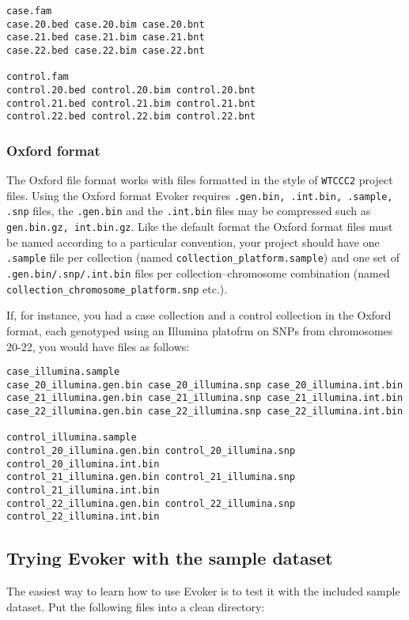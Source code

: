 \documentclass{article}
\begin{document}
\begin{verbatim}
case.fam
case.20.bed case.20.bim case.20.bnt 
case.21.bed case.21.bim case.21.bnt 
case.22.bed case.22.bim case.22.bnt 

control.fam
control.20.bed control.20.bim control.20.bnt
control.21.bed control.21.bim control.21.bnt
control.22.bed control.22.bim control.22.bnt
\end{verbatim}

\subsubsection{Oxford format}
The Oxford file format works with files formatted in the style of \texttt{WTCCC2} project files. Using the Oxford format Evoker requires \texttt{.gen.bin, .int.bin, .sample, .snp} files, the \texttt{.gen.bin} and the \texttt{.int.bin} files may be compressed such as \texttt{gen.bin.gz, int.bin.gz}. Like the default format the Oxford format files must be named according to a particular convention, your project should have one \texttt{.sample} file per collection (named \texttt{collection\_platform.sample}) and one set of \texttt{.gen.bin/.snp/.int.bin} files per collection--chromosome combination (named \texttt{collection\_chromosome\_platform.snp} etc.).

If, for instance, you had a case collection and a control collection in the Oxford format, each genotyped using an Illumina platofrm on SNPs from chromosomes 20-22, you would have files as follows:

\begin{verbatim}
case_illumina.sample
case_20_illumina.gen.bin case_20_illumina.snp case_20_illumina.int.bin 
case_21_illumina.gen.bin case_21_illumina.snp case_21_illumina.int.bin 
case_22_illumina.gen.bin case_22_illumina.snp case_22_illumina.int.bin

control_illumina.sample
control_20_illumina.gen.bin control_20_illumina.snp control_20_illumina.int.bin 
control_21_illumina.gen.bin control_21_illumina.snp control_21_illumina.int.bin 
control_22_illumina.gen.bin control_22_illumina.snp control_22_illumina.int.bin
\end{verbatim}

\subsection{Trying Evoker with the sample dataset}

The easiest way to learn how to use Evoker is to test it with the included sample dataset. Put the following files into a clean directory:
\end{document}

